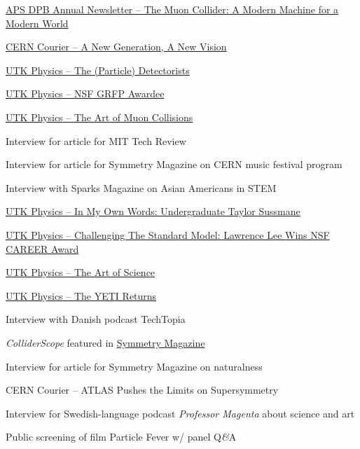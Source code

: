 \documentclass[11pt,letterpaper]{article}
\begin{document}
\begin{itemizetighter}
      \item \href{https://engage.aps.org/dpb/resources/newsletters/24-25-newsletter/f10-article}{APS DPB Annual Newsletter -- The Muon Collider: A Modern Machine for a Modern World}
      \item \href{https://cerncourier.com/a/a-new-generation-a-new-vision/}{CERN Courier -- A New Generation, A New Vision} 
      \item \href{https://physics.utk.edu/the-particle-detectorists/}{UTK Physics -- The (Particle) Detectorists} 
      \item \href{https://physics.utk.edu/four-ut-physics-students-win-doe-scgsr-support/}{UTK Physics -- NSF GRFP Awardee} 
      \item \href{https://physics.utk.edu/the-art-of-muon-collisions/}{UTK Physics -- The Art of Muon Collisions} 
      \item Interview for article for MIT Tech Review 
      \item Interview for article for Symmetry Magazine on CERN music festival program 
      \item Interview with Sparks Magazine on Asian Americans in STEM
      \item \href{https://physics.utk.edu/in-my-own-words-undergraduate-taylor-sussmane/}{UTK Physics -- In My Own Words: Undergraduate Taylor Sussmane} 
      \item \href{https://physics.utk.edu/challenging-the-standard-model-lawrence-lee-wins-nsf-career-award/}{UTK Physics -- Challenging The Standard Model: Lawrence Lee Wins NSF CAREER Award}
      \item \href{https://physics.utk.edu/the-art-of-science/}{UTK Physics -- The Art of Science} 
      \item \href{https://physics.utk.edu/the-yeti-returns/}{UTK Physics -- The YETI Returns} 
      \item Interview with Danish podcast TechTopia 
      \item \textit{ColliderScope} featured in \href{https://www.symmetrymagazine.org/article/lhc-music-through-the-colliderscope}{Symmetry Magazine} 
      \item Interview for article for Symmetry Magazine on naturalness 
      \item CERN Courier -- ATLAS Pushes the Limits on Supersymmetry 

      \item Interview for Swedish-language podcast \textit{Professor Magenta} about science and art 
      \item Public screening of film Particle Fever w/ panel Q\textit{\&}A


      \end{itemizetighter}
\end{document}
